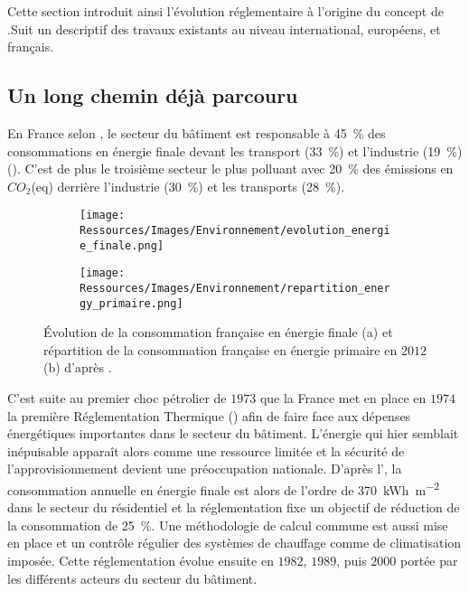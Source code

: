 Cette section introduit ainsi l’évolution réglementaire à l’origine du concept de
.Suit un descriptif des travaux existants au niveau international, européens,
et français.


\subsection{Un long chemin déjà parcouru} %
\label{sub:un_long_chemin_deja_parcouru}
En France selon \textcite{ADEME2015}, le secteur du bâtiment est responsable à
\SI{45}{\percent} des consommations en énergie finale devant les transport
(\SI{33}{\percent}) et l’industrie (\SI{19}{\percent})
(). C’est de plus le troisième secteur le plus
polluant avec \SI{20}{\percent} des émissions en $CO_{2}$(eq) derrière
l’industrie (\SI{30}{\percent}) et les transports (\SI{28}{\percent}).

\begin{figure}
    \centering
    \begin{subfigure}[b]{0.45\textwidth}
        \centering
        \texttt{[image: Ressources/Images/Environnement/evolution\_energie\_finale.png]}
        \caption{}
        \label{fig:evolution_energy_finale}
    \end{subfigure}
    \quad
    \begin{subfigure}[b]{0.45\textwidth}
        \centering
        \texttt{[image: Ressources/Images/Environnement/repartition\_energy\_primaire.png]}
        \caption{}
        \label{fig:repartition_conso_primaire}
    \end{subfigure}
    \caption[Description du secteur énergétique français]
             {Évolution de la consommation française en énergie finale (a) et
              répartition de la consommation française en énergie primaire en $2012$ (b)
              d’après \textcite{ADEME2015}.}
    \label{fig:energy_france}
\end{figure}

C’est suite au premier choc pétrolier de $1973$ que la France met en place en $1974$ la première
Réglementation Thermique () afin de faire face aux dépenses énergétiques importantes
dans le secteur du bâtiment. L’énergie qui hier semblait inépuisable apparaît
alors comme une ressource limitée et la sécurité de l’approvisionnement devient une
préoccupation nationale. D’après l’, la consommation annuelle en énergie finale est
alors de l’ordre de \SI{370}{kWh\per\metre\squared} dans le secteur du résidentiel et la
réglementation fixe un objectif de réduction de la consommation de
\SI{25}{\percent}. Une méthodologie de calcul commune est aussi mise en place et
un contrôle régulier des systèmes de chauffage comme de climatisation imposée.
Cette réglementation évolue ensuite en $1982$, $1989$, puis $2000$ portée par
les différents acteurs du secteur du bâtiment.

